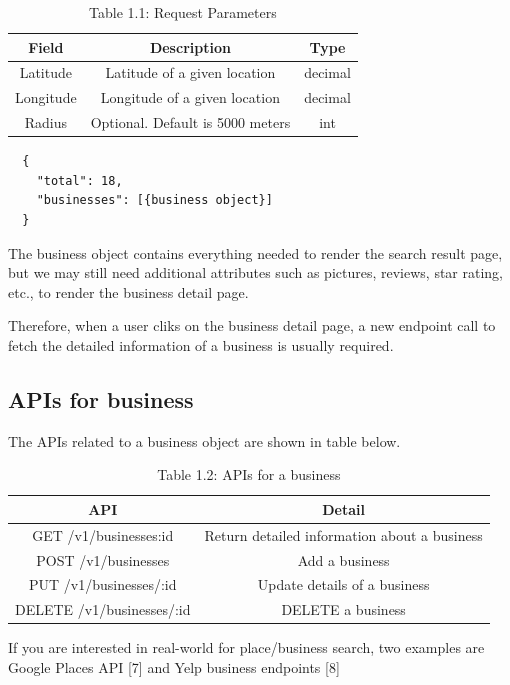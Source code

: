 \documentclass{report}
\theoremstyle{definition}
\let\oldsubsection\subsection
\renewcommand{\subsection}{\oldsubsection*}
\begin{document}
\begin{table}[htpb]
\centering
\caption{Table 1.1: Request Parameters}
\label{tab:label}
\begin{tabular}{|c|c|c|}
\hline
Field        & Description                      & Type \\
\hline
Latitude     & Latitude of a given location     & decimal \\
\hline
Longitude    & Longitude of a given location    & decimal \\
\hline
Radius       & Optional. Default is 5000 meters & int     \\
\hline
\end{tabular}
\end{table}

\begin{lstlisting}
  {
    "total": 18,
    "businesses": [{business object}]
  }
\end{lstlisting}

The business object contains everything needed to render the search result page, but we may still need additional attributes such as pictures, reviews, star rating, etc., to render the business detail page.

Therefore, when a user cliks on the business detail page, a new endpoint call to fetch the detailed information of a business is usually required.

\subsection{APIs for business}

The APIs related to a business object are shown in table below.

\begin{table}[htpb]
\caption{Table 1.2: APIs for a business}
\centering
\begin{tabular}{|c|c|}
\hline
\textbf{API} & \textbf{Detail} \\
\hline
GET /v1/businesses:id   & Return detailed information about a business \\
\hline
POST /v1/businesses     & Add a business \\
\hline
PUT /v1/businesses/:id  & Update details of a business \\
\hline
DELETE /v1/businesses/:id  & DELETE a business \\
\hline
\end{tabular}
\end{table}

If you are interested in real-world for place/business search, two examples are Google Places API [7] and Yelp business endpoints [8]
\end{document}
